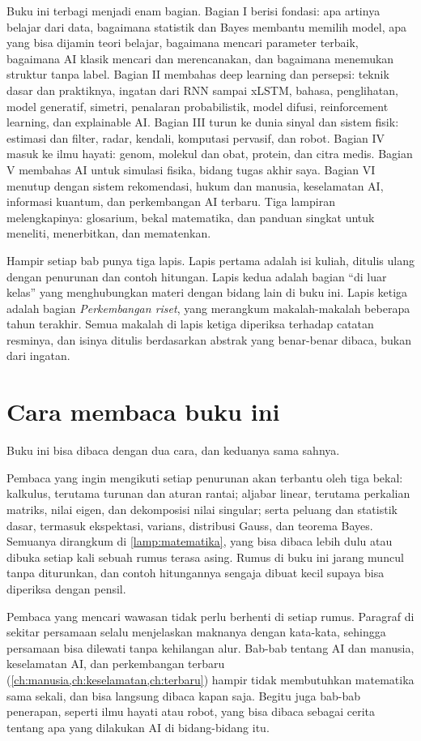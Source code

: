 Buku ini terbagi menjadi enam bagian. Bagian I berisi fondasi: apa artinya belajar dari data, bagaimana statistik dan Bayes membantu
memilih model, apa yang bisa dijamin teori belajar, bagaimana mencari parameter terbaik, bagaimana AI klasik mencari dan merencanakan,
dan bagaimana menemukan struktur tanpa label. Bagian II membahas deep learning dan persepsi: teknik dasar dan praktiknya, ingatan dari
RNN sampai xLSTM, bahasa, penglihatan, model generatif, simetri, penalaran probabilistik, model difusi, reinforcement learning, dan
explainable AI. Bagian III turun ke dunia sinyal dan sistem fisik: estimasi dan filter, radar, kendali, komputasi pervasif, dan robot.
Bagian IV masuk ke ilmu hayati: genom, molekul dan obat, protein, dan citra medis. Bagian V membahas AI untuk simulasi fisika, bidang
tugas akhir saya. Bagian VI menutup dengan sistem rekomendasi, hukum dan manusia, keselamatan AI, informasi kuantum, dan perkembangan AI
terbaru. Tiga lampiran melengkapinya: glosarium, bekal matematika, dan panduan singkat untuk meneliti, menerbitkan, dan mematenkan.

Hampir setiap bab punya tiga lapis. Lapis pertama adalah isi kuliah, ditulis ulang dengan penurunan dan contoh hitungan. Lapis kedua
adalah bagian ``di luar kelas'' yang menghubungkan materi dengan bidang lain di buku ini. Lapis ketiga adalah bagian \emph{Perkembangan
riset}, yang merangkum makalah-makalah beberapa tahun terakhir. Semua makalah di lapis ketiga diperiksa terhadap catatan resminya, dan
isinya ditulis berdasarkan abstrak yang benar-benar dibaca, bukan dari ingatan.

\section{Cara membaca buku ini}

Buku ini bisa dibaca dengan dua cara, dan keduanya sama sahnya.

Pembaca yang ingin mengikuti setiap penurunan akan terbantu oleh tiga bekal: kalkulus, terutama turunan dan aturan rantai; aljabar
linear, terutama perkalian matriks, nilai eigen, dan dekomposisi nilai singular; serta peluang dan statistik dasar, termasuk
ekspektasi, varians, distribusi Gauss, dan teorema Bayes. Semuanya dirangkum di \cref{lamp:matematika}, yang bisa dibaca lebih dulu
atau dibuka setiap kali sebuah rumus terasa asing. Rumus di buku ini jarang muncul tanpa diturunkan, dan contoh hitungannya sengaja
dibuat kecil supaya bisa diperiksa dengan pensil.

Pembaca yang mencari wawasan tidak perlu berhenti di setiap rumus. Paragraf di sekitar persamaan selalu menjelaskan maknanya dengan
kata-kata, sehingga persamaan bisa dilewati tanpa kehilangan alur. Bab-bab tentang AI dan manusia, keselamatan AI, dan perkembangan
terbaru (\cref{ch:manusia,ch:keselamatan,ch:terbaru}) hampir tidak membutuhkan matematika sama sekali, dan bisa langsung dibaca kapan
saja. Begitu juga bab-bab penerapan, seperti ilmu hayati atau robot, yang bisa dibaca sebagai cerita tentang apa yang dilakukan AI di
bidang-bidang itu.


